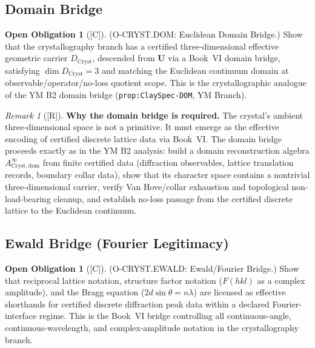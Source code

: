 \documentclass[12pt,oneside]{amsbook}
\theoremstyle{plain}
\theoremstyle{definition}
\newtheorem{obligation}[theorem]{Open Obligation}
\theoremstyle{remark}
\newtheorem{remark}[theorem]{Remark}
\newcommand{\status}[1]{\textup{[#1]}}
\begin{document}
\subsection{Domain Bridge}

\begin{obligation}[\status{C}]\label{ob:cryst-DOM}
\textup{(O-CRYST.DOM: Euclidean Domain Bridge.)}
Show that the crystallography branch has a certified
three-dimensional effective geometric carrier $D_{\mathrm{Cryst}}$,
descended from $\mathbf{U}$ via a Book~VI domain bridge, satisfying
$\dim D_{\mathrm{Cryst}} = 3$ and matching the Euclidean continuum
domain at observable/operator/no-loss quotient scope.  This is the
crystallographic analogue of the YM B2 domain bridge
(\texttt{prop:ClaySpec-DOM}, YM Branch).
\end{obligation}

\begin{remark}[\status{R}]\label{rem:cryst-dom-note}
\textbf{Why the domain bridge is required.}
The crystal's ambient three-dimensional space is not a primitive.
It must emerge as the effective encoding of certified discrete
lattice data via Book~VI.  The domain bridge proceeds exactly as in
the YM B2 analysis: build a domain reconstruction algebra
$A^{\infty}_{\mathrm{Cryst,dom}}$ from finite certified data
(diffraction observables, lattice translation records, boundary
collar data), show that its character space contains a nontrivial
three-dimensional carrier, verify Van Hove/collar exhaustion and
topological non-load-bearing cleanup, and establish no-loss passage
from the certified discrete lattice to the Euclidean continuum.
\end{remark}

\subsection{Ewald Bridge (Fourier Legitimacy)}

\begin{obligation}[\status{C}]\label{ob:cryst-EWALD}
\textup{(O-CRYST.EWALD: Ewald/Fourier Bridge.)}
Show that reciprocal lattice notation, structure factor notation
($F(hkl)$ as a complex amplitude), and the Bragg equation
($2d\sin\theta = n\lambda$) are licensed as effective shorthands
for certified discrete diffraction peak data within a declared
Fourier-interface regime.  This is the Book~VI bridge controlling
all continuous-angle, continuous-wavelength, and complex-amplitude
notation in the crystallography branch.
\end{obligation}
\end{document}
